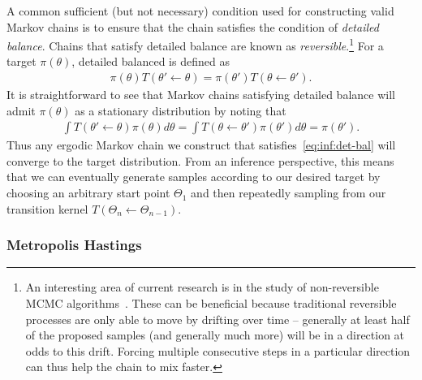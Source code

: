 A common sufficient (but not necessary) condition used for constructing valid Markov chains
is to ensure that the chain satisfies the condition of \emph{detailed balance}.  Chains that
satisfy detailed balance are known as 
\emph{reversible}.\footnote{An interesting area of current research is in the study
	of non-reversible MCMC algorithms~\citep{bouchard2015bouncy,bierkens2016zig}.  These can
	be beneficial because traditional reversible processes are only able to move by drifting over time -- generally
	at least half of the proposed samples (and generally much more) will be in a direction at odds to
	this drift.  Forcing multiple consecutive steps in a particular direction can thus
	help  the chain to mix faster.}
For a target $\pi(\theta)$, detailed balanced is defined as
\begin{align}
\label{eq:inf:det-bal}
\pi(\theta) T(\theta' \leftarrow \theta) = \pi(\theta') T(\theta \leftarrow \theta').
\end{align}
It is straightforward to see that Markov chains satisfying detailed balance will admit $\pi(\theta)$
as a stationary distribution by noting that
\begin{align}
\int T(\theta' \leftarrow \theta) \pi(\theta)d\theta =  
\int T(\theta \leftarrow \theta') \pi(\theta')d\theta = \pi(\theta').
\end{align}
Thus any ergodic Markov chain we construct that satisfies~\eqref{eq:inf:det-bal}
will converge to the target distribution.  From an inference perspective, this means that
we can eventually generate samples according to our desired target by choosing an 
arbitrary start point $\Theta_1$ and then repeatedly sampling from our transition kernel $T(\Theta_n \leftarrow \Theta_{n-1})$.

\subsubsection{Metropolis Hastings}
\label{sec:inf:foundation:mcmc:mh}

